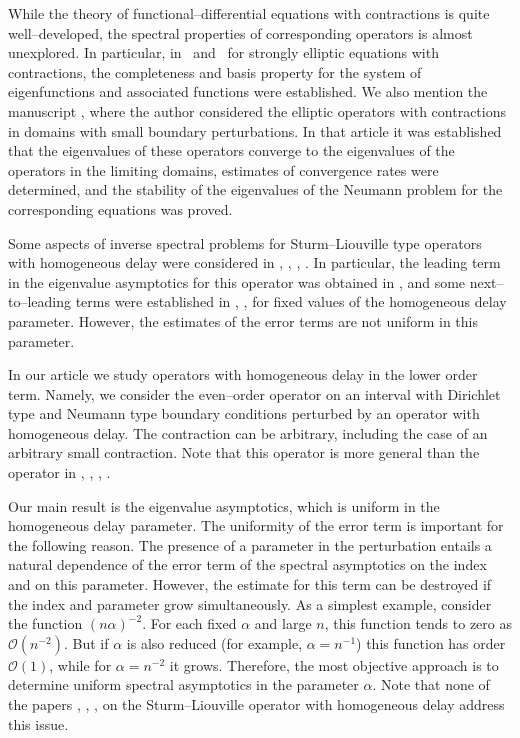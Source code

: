 \documentclass[11pt,centertags,reqno,twoside]{amsart}
\numberwithin{equation}{section}
\theoremstyle{definition}
\theoremstyle{remark}
\begin{document}
While the theory of functional--differential equations with contractions is quite well--developed, the spectral
properties of corresponding operators is almost unexplored. In particular, in~\cite{PodSkub} and~\cite{Skub} for
strongly elliptic equations with contractions, the completeness and basis property for the system of
eigenfunctions and associated functions were established. We also mention the manuscript \cite{Ros2017},
where the author considered the elliptic operators with contractions in domains with small boundary perturbations.
In that article it was established that the eigenvalues of these operators converge to the eigenvalues of the operators
in the limiting domains, estimates of convergence rates were determined, and the stability of
the eigenvalues of the Neumann problem for the corresponding equations was proved.

Some aspects of inverse spectral problems for Sturm--Liouville type
operators with homogeneous delay were considered in \cite{Nedic},
\cite{Pikula2014}, \cite{Pikula2013}, \cite{Djuric}. In particular,
the leading term in the eigenvalue asymptotics for this operator was obtained
in \cite{Djuric}, and some next--to--leading terms were established in \cite{Nedic},
\cite{Pikula2014}, \cite{Pikula2013} for fixed values of the homogeneous delay parameter.
However, the estimates of the error terms are not uniform in this parameter.

In our article we study operators with homogeneous delay in the lower order
term. Namely, we consider the even--order operator on an interval with
Dirichlet type and Neumann type boundary conditions perturbed by an operator
with homogeneous delay. The contraction can be arbitrary, including the case
of an arbitrary small contraction. Note that this operator is more general than
the operator in \cite{Nedic}, \cite{Pikula2014}, \cite{Pikula2013}, \cite{Djuric}.

Our main result is the eigenvalue asymptotics, which is uniform in
the homogeneous delay parameter. The uniformity of the error term is
important for the following reason. The presence of a parameter in the perturbation
entails a natural dependence of the error term of the spectral asymptotics
on the index and on this parameter.
However, the estimate for this term can be destroyed if the index and parameter
grow simultaneously. As a simplest example, consider the function $(n\alpha)^{-2}$.
For each fixed $\alpha$ and large $n$, this function tends to zero as
$\mathcal{O}(n^{-2})$. But if $\alpha$ is also reduced (for example, $\alpha=n^{-1}$)
this function has order $\mathcal{O}(1)$, while for $\alpha=n^{-2}$
it grows. Therefore, the most objective approach is to determine uniform
spectral asymptotics in the parameter $\alpha$. Note that none of the papers
\cite{Nedic}, \cite{Pikula2014}, \cite{Pikula2013}, \cite{Djuric} on the
Sturm--Liouville operator with homogeneous delay address this issue.
\end{document}
